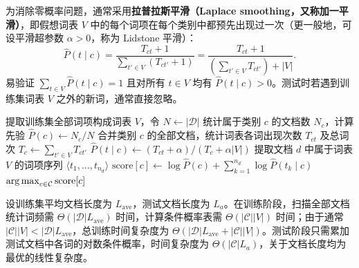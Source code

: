 为消除零概率问题，通常采用\textbf{拉普拉斯平滑（Laplace smoothing，又称加一平滑）}，即假想词表 $V$ 中的每个词项在每个类别中都预先出现过一次（更一般地，可设平滑超参数 $\alpha>0$，称为 Lidstone 平滑）：
\begin{equation}\label{eq:nb-laplace}
\hat{P}(t\mid c) = \frac{T_{ct} + 1}{\sum_{t'\in V} (T_{ct'} + 1)}
= \frac{T_{ct} + 1}{\left(\sum_{t'\in V} T_{ct'}\right) + |V|}.
\end{equation}
易验证 $\sum_{t\in V}\hat{P}(t\mid c)=1$ 且对所有 $t\in V$ 均有 $\hat{P}(t\mid c)>0$。测试时若遇到训练集词表 $V$ 之外的新词，通常直接忽略。

\begin{algorithm}[多项式朴素贝叶斯训练与预测]\label{alg:mnb}
  \begin{algsteps}
    \State {}
    \State 提取训练集全部词项构成词表 $V$，令 $N \gets |\mathcal{D}|$
      \State 统计属于类别 $c$ 的文档数 $N_c$，计算先验 $\hat{P}(c) \gets N_c / N$
      \State 合并类别 $c$ 的全部文档，统计词表各词出现次数 $T_{ct}$ 及总词次 $T_c \gets \sum_{t'\in V} T_{ct'}$
        \State $\hat{P}(t\mid c) \gets (T_{ct} + \alpha) / (T_c + \alpha |V|)$
      \EndFor
    \EndFor
    \State {}
    \State 提取文档 $d$ 中属于词表 $V$ 的词项序列 $\langle t_1,\dots,t_{n_d}\rangle$
      \State $\mathrm{score}[c] \gets \log \hat{P}(c) + \sum_{k=1}^{n_d} \log \hat{P}(t_k\mid c)$
    \EndFor
    \State \Return $\operatorname*{arg\,max}_{c\in\mathcal{C}} \mathrm{score}[c]$
  \end{algsteps}
\end{algorithm}

设训练集平均文档长度为 $L_{\mathrm{ave}}$，测试文档长度为 $L_a$。在训练阶段，扫描全部文档统计词频需 $\Theta(|\mathcal{D}|L_{\mathrm{ave}})$ 时间，计算条件概率表需 $\Theta(|\mathcal{C}||V|)$ 时间；由于通常 $|\mathcal{C}||V| < |\mathcal{D}|L_{\mathrm{ave}}$，总训练时间复杂度为 $\Theta(|\mathcal{D}|L_{\mathrm{ave}} + |\mathcal{C}||V|)$。测试阶段只需累加测试文档中各词的对数条件概率，时间复杂度为 $\Theta(|\mathcal{C}|L_a)$，关于文档长度均为最优的线性复杂度。

